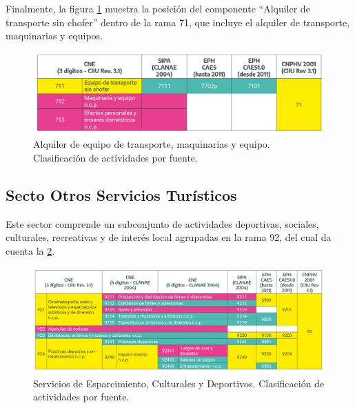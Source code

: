 \documentclass[
  openany]{book}
\begin{document}
Finalmente, la figura \ref{fig:empleofuentes10} muestra la posición del componente ``Alquiler de transporte sin chofer'' dentro de la rama 71, que incluye el alquiler de transporte, maquinarias y equipos.

\begin{figure}

{\centering \includegraphics[width=1\linewidth]{imagenes/figura3.10} 

}

\caption{ Alquiler de equipo de transporte, maquinarias y equipo. Clasificación de actividades por fuente.}\label{fig:empleofuentes10}
\end{figure}

\hypertarget{secto-otros-servicios-turuxedsticos}{%
\subsection{Secto Otros Servicios Turísticos}\label{secto-otros-servicios-turuxedsticos}}

Este sector comprende un subconjunto de actividades deportivas, sociales, culturales, recreativas y de interés local agrupadas en la rama 92, del cual da cuenta la \ref{fig:empleofuentes11}.

\begin{figure}

{\centering \includegraphics[width=1\linewidth]{imagenes/figura3.11} 

}

\caption{ Servicios de Esparcimiento, Culturales y  Deportivos. Clasificación de actividades por fuente.}\label{fig:empleofuentes11}
\end{figure}
\end{document}
